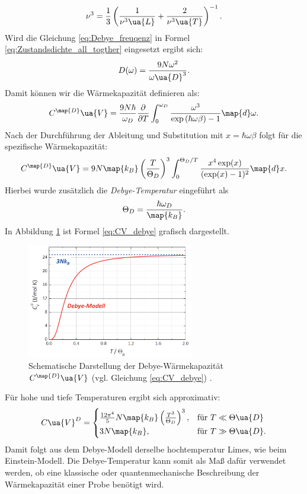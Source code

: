 \begin{equation*}
  \nu^3= \frac{1}{3}\left(\frac{1}{\nu^3\ua{L}} + \frac{2}{\nu^3\ua{T}}\right)^{-1}.
\end{equation*}
Wird die Gleichung \eqref{eq:Debye_freuqenz} in Formel \eqref{eq:Zustandsdichte_all_togther}
eingesetzt ergibt sich:
\begin{equation}
  \label{eq:Zustandsdichte_Debye}
  D(\omega)= \frac{9N\omega^2}{\omega\ua{D}^3}.
\end{equation}
Damit können wir die Wärmekapazität definieren als:
\begin{equation}
  \label{eq:CVD_ohne_x}
  C^{\map{D}}\ua{V}=\frac{9N\hbar}{\omega_D}\frac{\partial}{\partial T}\int^{\omega_D}_{0}\frac{\omega^3}{\exp\left(\hbar\omega\beta\right)-1} \map{d}\omega.
\end{equation}
Nach der Durchführung der Ableitung und Substitution mit $x=\hbar\omega\beta$
folgt für die spezifische Wärmekapazität:
\begin{equation}
  \label{eq:CV_debye}
  C^{\map{D}}\ua{V}=9N\map{k_B}\left(\frac{T}{\Theta_D}\right)^3\int^{\Theta_D/T}_{0} \frac{x^4\exp(x)}{(\exp(x)-1)^2}\map{d}x.
\end{equation}
Hierbei wurde zusätzlich die \emph{Debye-Temperatur} eingeführt als
\begin{equation}
  \label{eq:Debye_Temp}
  \Theta_D = \frac{\hbar\omega_D}{\map{k_B}}.
\end{equation}
In Abbildung \ref{fig: CVD_plot} ist Formel \eqref{eq:CV_debye} grafisch dargestellt.
\begin{figure}
  \centering
  \includegraphics[width = 0.65\textwidth]{./content/images/C_V_debye.PNG}
  \caption{Schematische Darstellung der Debye-Wärmekapazität $C^{\map{D}}\ua{V}$ (vgl. Gleichung \eqref{eq:CV_debye})  \cite[S. 228]{marx}.}
  \label{fig: CVD_plot}
\end{figure}
Für hohe und tiefe Temperaturen ergibt sich approximativ:
\begin{equation}
  C\ua{V}^{D}=
  \begin{cases}
    \frac{12\pi^4}{5}N\map{k_B}\left(\frac{T^3}{\Theta_D}\right)^3, &\text{für } T\ll\Theta\ua{D}  \\
     3N\map{k_B}, & \text{für } T \gg \Theta\ua{D}.
  \end{cases}
\end{equation}
Damit folgt aus dem Debye-Modell derselbe hochtemperatur Limes, wie beim Einstein-Modell.
Die Debye-Temperatur kann somit als Maß dafür verwendet werden, ob eine klassische
oder quantenmechanische Beschreibung der Wärmekapazität einer Probe benötigt wird.
